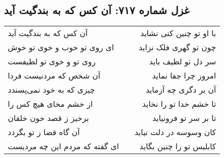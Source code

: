 \begin{center}
\section*{غزل شماره ۷۱۷: آن کس که به بندگیت آید}
\label{sec:0717}
\begin{longtable}{l p{0.5cm} r}
آن کس که به بندگیت آید
&&
با او تو چنین کنی نشاید
\\
ای روی تو خوب و خوی تو خوش
&&
چون تو گهری فلک نزاید
\\
روی تو و خوی تو لطیفست
&&
سر دل تو لطیف باید
\\
آن شخص که مردنیست فردا
&&
امروز چرا جفا نماید
\\
چیزی که به خود نمی‌پسندد
&&
آن بر دگری چه آزماید
\\
از خشم مخای هیچ کس را
&&
تا خشم خدا تو را نخاید
\\
برخیز ز قصد خون خلقان
&&
تا بر سر تو فرونیاید
\\
آن گاه قضا ز تو بگردد
&&
کان وسوسه در دلت نیاید
\\
ای گفته که مردم این چه مردیست
&&
کابلیس تو را چنین بگاید
\\
\end{longtable}
\end{center}
